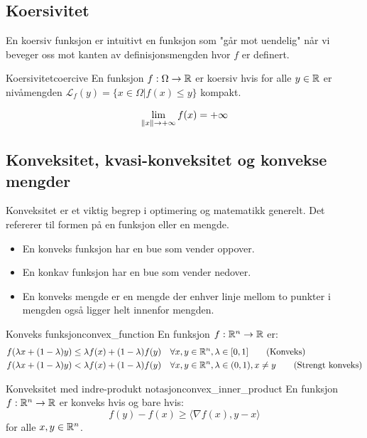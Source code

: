 \subsection{Koersivitet}
En koersiv funksjon er intuitivt en funksjon som "går mot uendelig" når vi beveger oss mot kanten av definisjonsmengden hvor \( f \) er definert.

\begin{definition}{Koersivitet}{coercive}
	En funksjon \(f: \Omega \to \mathbb{R}\) er koersiv hvis for alle \(y \in \mathbb{R}\) er nivåmengden \(\mathcal{L}_f(y) = \{x \in \Omega | f(x) \leq y\}\) kompakt.

	\[
		\lim_{\lVert x\rVert \to +\infty} f(x) = +\infty
	\]
\end{definition}

\subsection{Konveksitet, kvasi-konveksitet og konvekse mengder}

Konveksitet er et viktig begrep i optimering og matematikk generelt. Det refererer til formen på en funksjon eller en mengde.
\begin{itemize}
	\item En konveks funksjon har en bue som vender oppover.
	\item En konkav funksjon har en bue som vender nedover.
	\item En konveks mengde er en mengde der enhver linje mellom to punkter i mengden også ligger helt innenfor mengden.
\end{itemize}

\begin{definition}{Konveks funksjon}{convex_function}
	En funksjon \(f: \mathbb{R}^n \to \mathbb{R}\) er:
	\begin{align*}
		f(\lambda x + (1-\lambda)y) & \leq \lambda f(x) + (1-\lambda)f(y) \quad \forall x, y \in \mathbb{R}^n, \lambda \in [0, 1] \tag{Konveks}                  \\
		f(\lambda x + (1-\lambda)y) & < \lambda f(x) + (1 - \lambda)f(y) \quad \forall x, y \in \mathbb{R}^n, \lambda \in (0, 1), x \neq y \tag{Strengt konveks}
	\end{align*}
\end{definition}

\begin{remark}{Konveksitet med indre-produkt notasjon}{convex_inner_product}
	En funksjon  \(f: \mathbb{R}^n \to \mathbb{R}\) er konveks hvis og bare hvis:
	\[
		f(y) - f(x) \geq  \langle \nabla f(x), y - x \rangle
	\]
	for alle  \(x, y \in \mathbb{R}^n\).
\end{remark}


